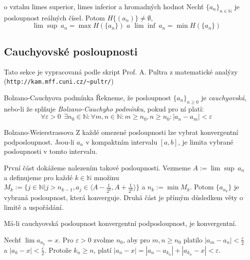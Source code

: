 \begin{vetaN}{o vztahu limes superior, limes inferior a hromadných hodnot}
Nechť $\{a_n\}_{n \in \mathbb{N}}$ je posloupnost reálných čísel. Potom $H\{(a_n)\} \neq \emptyset$,
$$
\lim \sup~a_n = \max H(\{a_n\}) \textit{ a } \lim \inf~a_n = \min H(\{a_n\})
$$
\end{vetaN}

\subsection{Cauchyovské posloupnosti}

Tato sekce je vypracovaná podle skript Prof. A. Pultra z matematické analýzy\\
(\texttt{http://kam.mff.cuni.cz/\~{}pultr/})
\bigskip

\begin{definiceN}{Bolzano-Cauchyova podmínka}
Řekneme, že posloupnost $\{a_n\}_{n\geq 0}$ je \emph{cauchyovská}, nebo-li že splňuje \emph{Bolzano-Cauchyho podmínku}, pokud pro ní platí:
$$
\forall \varepsilon > 0~~\exists n_0 \in \mathbb{N}: \forall m, n \in \mathbb{N}: m \ge n_0, n \ge n_0: |a_n - a_m| < \varepsilon
$$
\end{definiceN}

\begin{vetaN}{Bolzano-Weierstrassova}
Z každé omezené posloupnosti lze vybrat konvergentní podposloupnost. Jsou-li $a_n$ v kompaktním intervalu $[a,b]$, je limita vybrané posloupnosti v tomto intervalu.

\medskip\begin{dukaz}
První část dokážeme nalezením takové posloupnosti. Vezmeme $A:=\lim\sup~a_n$ a definujeme pro každé $k\in\mathbb{N}$ množinu $M_k:=\{j\in\mathbb{N}|j>n_{k-1},a_j\in\langle A - \frac{1}{2^k}, A + \frac{1}{2^k}\rangle\}$ a $n_k:=\min M_k$. Potom $\{a_{n_k}\}$ je vybraná posloupnost, která konverguje. Druhá část je přímým důsledkem věty o limitě a uspořádání.
\end{dukaz}
\end{vetaN}

\begin{lemma}
Má-li cauchyovská posloupnost konvergentní podposloupnost, je konvergentní.

\medskip\begin{dukaz}
Nechť $\lim a_{n_k} = x$. Pro $\varepsilon > 0$ zvolme $n_0$, aby pro $m,n\geq n_0$ platilo $|a_m-a_n|<\frac{\varepsilon}{2}$ a $|a_k-x|<\frac{\varepsilon}{2}$. Protože $k_n\geq n$, platí $|a_n-x|=|a_n-a_{k_n}|+|a_{k_n}-x|<\varepsilon$.
\end{dukaz}
\end{lemma}


